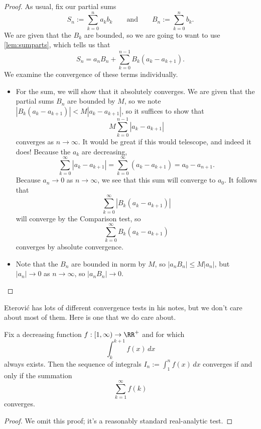 \begin{proof}
	As usual, fix our partial sums
	\[S_n:=\sum_{k=0}^na_kb_k\qquad\text{and}\qquad B_n:=\sum_{k=0}^nb_k.\]
	We are given that the $B_k$ are bounded, so we are going to want to use \autoref{lem:sumparts}, which tells us that
	\[S_n=a_nB_n+\sum_{k=0}^{n-1}B_k(a_k-a_{k+1}).\]
	We examine the convergence of these terms individually.
	\begin{itemize}
		\item For the sum, we will show that it absolutely converges. We are given that the partial sums $B_n$ are bounded by $M$, so we note $|B_k(a_k-a_{k+1})|<M|a_k-a_{k+1}|$, so it suffices to show that
		\[M\sum_{k=0}^{n-1}\left|a_k-a_{k+1}\right|\]
		converges as $n\to\infty$. It would be great if this would telescope, and indeed it does! Because the $a_k$ are decreasing,
		\[\sum_{k=0}^\infty|a_k-a_{k+1}|=\sum_{k=0}^\infty(a_k-a_{k+1})=a_0-a_{n+1}.\]
		Because $a_n\to0$ as $n\to\infty$, we see that this sum will converge to $a_0$. It follows that
		\[\sum_{k=0}^\infty|B_k(a_k-a_{k+1})|\]
		will converge by the Comparison test, so
		\[\sum_{k=0}^\infty B_k(a_k-a_{k+1})\]
		converges by absolute convergence.
		\item Note that the $B_n$ are bounded in norm by $M$, so $|a_nB_n|\le M|a_n|$, but $|a_n|\to0$ as $n\to\infty$, so $|a_nB_n|\to0$.
		\qedhere
	\end{itemize}
\end{proof}
Eterovi\'c has lots of different convergence tests in his notes, but we don't care about most of them. Here is one that we do care about.
\begin{theorem}
	Fix a decreasing function $f:\left[1,\infty\right)\to\RR^+$ and for which
	\[\int_k^{k+1}f(x)\,dx\]
	always exists. Then the sequence of integrals $I_n:=\int_1^nf(x)\,dx$ converges if and only if the summation
	\[\sum_{k=1}^\infty f(k)\]
	converges.
\end{theorem}
\begin{proof}
	We omit this proof; it's a reasonably standard real-analytic test.
\end{proof}